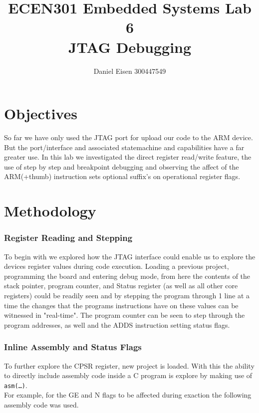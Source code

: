 \documentclass[11pt]{article}
\title{ECEN301 Embedded Systems Lab 6 \\ JTAG Debugging}
\author{Daniel Eisen 300447549}
\begin{document}
\begin{preview}
\maketitle
\section{Objectives}
So far we have only used the JTAG port for upload our code to the ARM device. But the port/interface and associated statemachine and capabilities have a far greater use. In this lab we investigated the direct register read/write feature, the use of step by step and breakpoint debugging and observing the affect of the ARM(+thumb) instruction sets optional suffix's on operational register flags. 
\section{Methodology}
\subsubsection*{Register Reading and Stepping}
To begin with we explored how the JTAG interface could enable us to explore the devices register values during code execution. Loading a previous project, programming the board and entering debug mode, from here the contents of the stack pointer, program counter, and Status register (as well as all other core registers) could be readily seen and by stepping the program through 1 line at a time the changes that the programs instructions have on these values can be witnessed in "real-time". The program counter can be seen to step through the program addresses, as well and the ADDS instruction setting status flags.

\subsubsection*{Inline Assembly and Status Flags}
To further explore the CPSR register, new project is loaded. With this the ability to directly include assembly code inside a C program is explore by making use of \texttt{asm(\dots)}.\\ For example, for the GE and N flags to be affected during exaction the following assembly code was used.\\



\end{preview}
\end{document}
